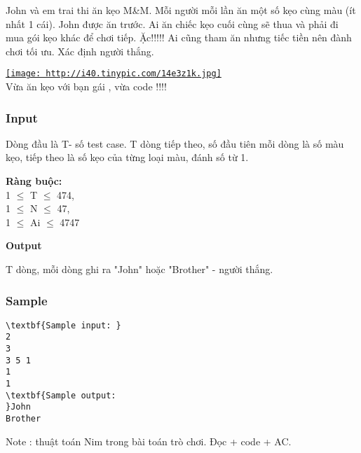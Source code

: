 

John và em trai thi ăn kẹo M\&M. Mỗi người mỗi lần ăn một số kẹo cùng màu (ít nhất 1 cái). John được ăn trước. Ai ăn chiếc kẹo cuối cùng sẽ thua và phải đi mua gói kẹo khác để chơi tiếp. Ặc!!!!! Ai cũng tham ăn nhưng tiếc tiền nên đành chơi tối ưu. Xác định người thắng.

\href{http://tinypic.com}{
\texttt{[image: http://i40.tinypic.com/14e3z1k.jpg]}}
\\Vừa ăn kẹo với bạn gái , vừa code !!!!

\subsubsection{Input}

Dòng đầu là T- số test case. T dòng tiếp theo, số đầu tiên mỗi dòng là số màu kẹo, tiếp theo là số kẹo của từng loại màu, đánh số từ 1.

\textbf{Ràng buộc:}
\\1  $\le$  T  $\le$  474,
\\1  $\le$  N  $\le$  47,
\\1  $\le$  Ai  $\le$  4747

\textbf{Output}

T dòng, mỗi dòng ghi ra "John" hoặc "Brother" - người thắng.

\subsubsection{Sample}
\begin{verbatim}
\textbf{Sample input: }
2 
3 
3 5 1 
1 
1 
\textbf{Sample output: 
}John 
Brother \end{verbatim}

Note : thuật toán Nim trong bài toán trò chơi. Đọc + code + AC.
